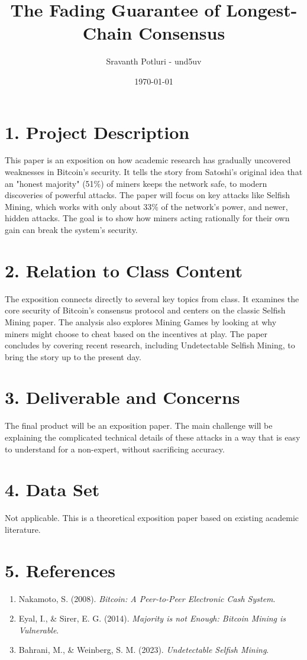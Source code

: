 \documentclass[12pt]{article}
\title{The Fading Guarantee of Longest-Chain Consensus}
\author{Sravanth Potluri - und5uv}
\date{\today}
\theoremstyle{definition}
\begin{document}
\maketitle

\section*{1. Project Description}

This paper is an exposition on how academic research has gradually uncovered weaknesses in Bitcoin's security. It tells the story from Satoshi's original idea that an "honest majority" (51\%) of miners keeps the network safe, to modern discoveries of powerful attacks. The paper will focus on key attacks like Selfish Mining, which works with only about 33\% of the network's power, and newer, hidden attacks. The goal is to show how miners acting rationally for their own gain can break the system's security.

\section*{2. Relation to Class Content}

The exposition connects directly to several key topics from class. It examines the core security of Bitcoin's consensus protocol and centers on the classic Selfish Mining paper. The analysis also explores Mining Games by looking at why miners might choose to cheat based on the incentives at play. The paper concludes by covering recent research, including Undetectable Selfish Mining, to bring the story up to the present day.

\section*{3. Deliverable and Concerns}

The final product will be an exposition paper. The main challenge will be explaining the complicated technical details of these attacks in a way that is easy to understand for a non-expert, without sacrificing accuracy.

\section*{4. Data Set}

Not applicable. This is a theoretical exposition paper based on existing academic literature.

\section*{5. References}
\begin{enumerate}
    \item Nakamoto, S. (2008). \textit{Bitcoin: A Peer-to-Peer Electronic Cash System}.
    \item Eyal, I., \& Sirer, E. G. (2014). \textit{Majority is not Enough: Bitcoin Mining is Vulnerable}.
    \item Bahrani, M., \& Weinberg, S. M. (2023). \textit{Undetectable Selfish Mining}.
\end{enumerate}
\end{document}
